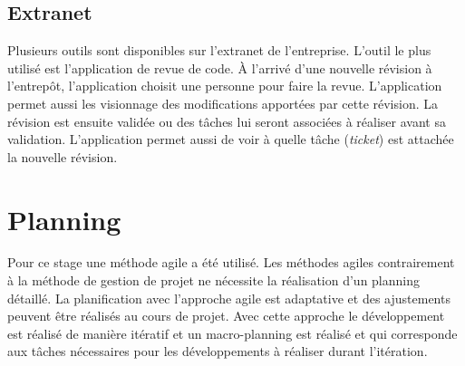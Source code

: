 \subsection{Extranet}
Plusieurs outils sont disponibles sur l'extranet de l'entreprise. L'outil le plus utilisé est l'application de revue de code. \`A l'arrivé d'une nouvelle révision à l'entrepôt, l'application choisit une personne pour faire la revue. L'application permet aussi les visionnage des modifications apportées par cette révision. La révision est ensuite validée ou des tâches lui seront associées à réaliser avant sa validation. L'application permet aussi de voir à quelle tâche (\textit{ticket}) est attachée la nouvelle révision.   

\section{Planning}
Pour ce stage une méthode agile a été utilisé. Les méthodes agiles contrairement à la méthode de gestion de projet ne nécessite la réalisation d'un planning détaillé. La planification avec l'approche agile est adaptative et des ajustements peuvent être réalisés au cours de projet. Avec cette approche le développement est réalisé de manière itératif et un macro-planning est réalisé et qui corresponde aux tâches nécessaires pour les développements à réaliser durant l'itération. 

